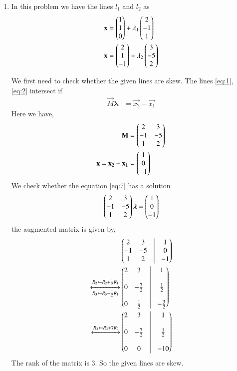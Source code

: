 \documentclass[journal,12pt,twocolumn]{IEEEtran}
\begin{document}
\begin{enumerate}
\begin{enumerate}
\item In this problem we have the lines $l_1$ and $l_2$ as
\begin{align}
\mathbf{x} &= \begin{pmatrix}1\\1\\0\end{pmatrix} + \lambda_1\begin{pmatrix}2\\-1\\1\end{pmatrix}\\
\mathbf{x} &= \begin{pmatrix}2\\1\\-1\end{pmatrix} + \lambda_2\begin{pmatrix}3\\-5\\2\end{pmatrix}
\end{align}

We first need to check whether the given lines are skew.
The lines \eqref{eq:1}, \eqref{eq:2} intersect if
\begin{align}
\vec{M}\bm{\lambda} &= \vec{x_2} - \vec{x_1}
\end{align}
Here we have,
\begin{align}
\mathbf{M} &= \begin{pmatrix}2&3\\-1&-5\\1&2\end{pmatrix} \label{eq:M}\\
\mathbf{x} = \mathbf{x_2} - \mathbf{x_1} &= \begin{pmatrix}1\\0\\-1\end{pmatrix} \label{eq:x}
\end{align}
We check whether the equation \eqref{eq:7} has a solution
\begin{align}
\begin{pmatrix}2&3\\-1&-5\\1&2\end{pmatrix}\bm{\lambda} = \begin{pmatrix}1\\0\\-1\end{pmatrix}
\label{eq:7}
\end{align}
the augmented matrix is given by,
\begin{align}
&\myvec{2&3&\vrule&1\\-1&-5&\vrule&0\\1&2&\vrule&-1}\\
\xleftrightarrow[R_3 \leftarrow R_3 - \frac{1}{2}R_1]{R_2 \leftarrow R_2 + \frac{1}{2}R_1}
&\myvec{2&3&\vrule&1\\&&\vrule\\0&-\frac{7}{2}&\vrule&\frac{1}{2}\\&&\vrule\\0&\frac{1}{2}&\vrule&-\frac{3}{2}}\\
\xleftrightarrow{R_3 \leftarrow R_3 + 7R_2}
&\myvec{2&3&\vrule&1\\&&\vrule\\0&-\frac{7}{2}&\vrule&\frac{1}{2}\\&&\vrule\\0&0&\vrule&-10}
\end{align}
The rank of the matrix is 3. So the given lines are skew.


\end{enumerate}
\end{enumerate}
\end{document}
